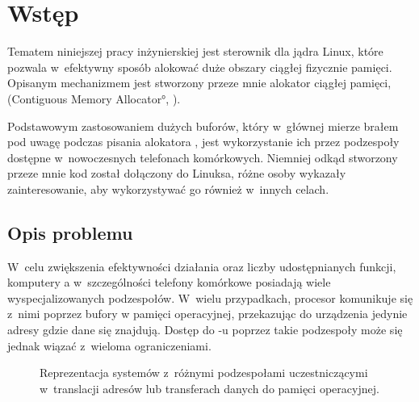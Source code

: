 \chapter{Wstęp}

Tematem niniejszej pracy inżynierskiej jest sterownik dla jądra Linux,
które pozwala w~efektywny sposób alokować duże obszary ciągłej
fizycznie pamięci.  Opisanym mechanizmem jest stworzony przeze mnie
alokator ciągłej pamięci, (\ang{Contiguous Memory Allocator}, ).

Podstawowym zastosowaniem dużych buforów, który w~głównej mierze
brałem pod uwagę podczas pisania alokatora , jest
wykorzystanie ich przez podzespoły dostępne w~nowoczesnych telefonach
komórkowych.  Niemniej odkąd stworzony przeze mnie kod został
dołączony do Linuksa, różne osoby wykazały zainteresowanie, aby
wykorzystywać go również w~innych celach.


\section{Opis problemu}

W~celu zwiększenia efektywności działania oraz liczby udostępnianych
funkcji, komputery a w~szczególności telefony komórkowe posiadają
wiele wyspecjalizowanych podzespołów.  W~wielu przypadkach, procesor
komunikuje się z~nimi poprzez bufory w pamięci operacyjnej,
przekazując do urządzenia jedynie adresy gdzie dane się znajdują.
Dostęp do -u poprzez takie podzespoły może się jednak wiązać
z~wieloma ograniczeniami.

\begin{figure}[tbp]
  \centering
   \qquad
  \qquad
  \caption[Różne przestrzenie adresowe dostępne
    w~komputerze.]{Reprezentacja systemów z~różnymi podzespołami
    uczestniczącymi w~translacji adresów lub transferach danych do
    pamięci operacyjnej.}
  \label{fig:mmu-iommu}
\end{figure}

